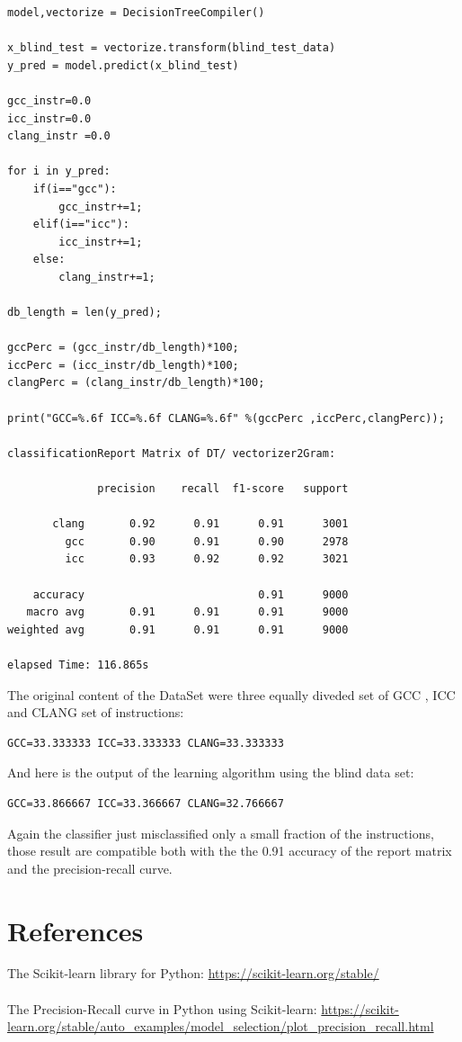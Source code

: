 \documentclass{article}
\begin{document}
\begin{verbatim}
model,vectorize = DecisionTreeCompiler()

x_blind_test = vectorize.transform(blind_test_data)
y_pred = model.predict(x_blind_test)

gcc_instr=0.0
icc_instr=0.0
clang_instr =0.0

for i in y_pred:
    if(i=="gcc"):
        gcc_instr+=1;
    elif(i=="icc"):
        icc_instr+=1;
    else:
        clang_instr+=1;

db_length = len(y_pred);

gccPerc = (gcc_instr/db_length)*100;
iccPerc = (icc_instr/db_length)*100;
clangPerc = (clang_instr/db_length)*100;

print("GCC=%.6f ICC=%.6f CLANG=%.6f" %(gccPerc ,iccPerc,clangPerc));

classificationReport Matrix of DT/ vectorizer2Gram:

              precision    recall  f1-score   support

       clang       0.92      0.91      0.91      3001
         gcc       0.90      0.91      0.90      2978
         icc       0.93      0.92      0.92      3021

    accuracy                           0.91      9000
   macro avg       0.91      0.91      0.91      9000
weighted avg       0.91      0.91      0.91      9000

elapsed Time: 116.865s

\end{verbatim}
The original content of the DataSet were three equally diveded set of GCC , ICC and CLANG set of instructions:
\begin{verbatim}
GCC=33.333333 ICC=33.333333 CLANG=33.333333
\end{verbatim}
And here is the output of the learning algorithm using the blind data set:
\begin{verbatim}
GCC=33.866667 ICC=33.366667 CLANG=32.766667
\end{verbatim}
Again the classifier just misclassified only a small fraction of the instructions, those result are compatible both with the the 0.91 accuracy of the report matrix and the precision-recall curve.

\section{References}
	The Scikit-learn library for Python: \url{https://scikit-learn.org/stable/}\\\\
	The Precision-Recall curve in Python using Scikit-learn: \url{https://scikit-learn.org/stable/auto_examples/model_selection/plot_precision_recall.html}
\end{document}
